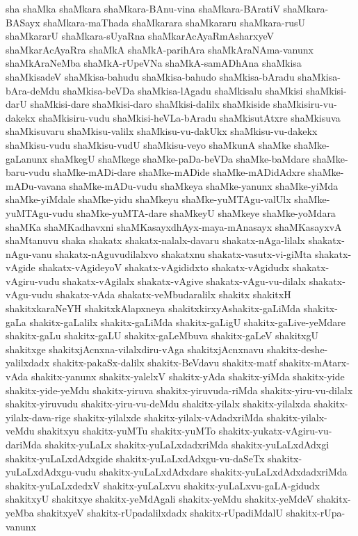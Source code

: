 {sha
shaMka
shaMkara
shaMkara-BAnu-vina
shaMkara-BAratiV
shaMkara-BASayx
shaMkara-maThada
shaMkarara
shaMkararu
shaMkara-rusU
shaMkararU
shaMkara-sUyaRna
shaMkarAcAyaRmAsharxyeV
shaMkarAcAyaRra
shaMkA
shaMkA-parihAra
shaMkAraNAma-vanunx
shaMkAraNeMba
shaMkA-rUpeVNa
shaMkA-samADhAna
shaMkisa
shaMkisadeV
shaMkisa-bahudu
shaMkisa-bahudo
shaMkisa-bAradu
shaMkisa-bAra-deMdu
shaMkisa-beVDa
shaMkisa-lAgadu
shaMkisalu
shaMkisi
shaMkisi-darU
shaMkisi-dare
shaMkisi-daro
shaMkisi-dalilx
shaMkiside
shaMkisiru-vu-dakekx
shaMkisiru-vudu
shaMkisi-heVLa-bAradu
shaMkisutAtxre
shaMkisuva
shaMkisuvaru
shaMkisu-valilx
shaMkisu-vu-dakUkx
shaMkisu-vu-dakekx
shaMkisu-vudu
shaMkisu-vudU
shaMkisu-veyo
shaMkunA
shaMke
shaMke-gaLanunx
shaMkegU
shaMkege
shaMke-paDa-beVDa
shaMke-baMdare
shaMke-baru-vudu
shaMke-mADi-dare
shaMke-mADide
shaMke-mADidAdxre
shaMke-mADu-vavana
shaMke-mADu-vudu
shaMkeya
shaMke-yanunx
shaMke-yiMda
shaMke-yiMdale
shaMke-yidu
shaMkeyu
shaMke-yuMTAgu-valUlx
shaMke-yuMTAgu-vudu
shaMke-yuMTA-dare
shaMkeyU
shaMkeye
shaMke-yoMdara
shaMKa
shaMKadhavxni
shaMKasayxdhAyx-maya-mAnasayx
shaMKasayxvA
shaMtanuvu
shaka
shakatx
shakatx-nalalx-davaru
shakatx-nAga-lilalx
shakatx-nAgu-vanu
shakatx-nAguvudilalxvo
shakatxnu
shakatx-vasutx-vi-giMta
shakatx-vAgide
shakatx-vAgideyoV
shakatx-vAgididxto
shakatx-vAgidudx
shakatx-vAgiru-vudu
shakatx-vAgilalx
shakatx-vAgive
shakatx-vAgu-vu-dilalx
shakatx-vAgu-vudu
shakatx-vAda
shakatx-veMbudaralilx
shakitx
shakitxH
shakitxkaraNeYH
shakitxkAlapxneya
shakitxkirxyAshakitx-gaLiMda
shakitx-gaLa
shakitx-gaLalilx
shakitx-gaLiMda
shakitx-gaLigU
shakitx-gaLive-yeMdare
shakitx-gaLu
shakitx-gaLU
shakitx-gaLeMbuva
shakitx-gaLeV
shakitxgU
shakitxge
shakitxjAcnxna-vilalxdiru-vAga
shakitxjAcnxnavu
shakitx-deshe-yalilxdadx
shakitx-pakaSx-dalilx
shakitx-BeVdavu
shakitx-matf
shakitx-mAtarx-vAda
shakitx-yanunx
shakitx-yalelxV
shakitx-yAda
shakitx-yiMda
shakitx-yide
shakitx-yide-yeMdu
shakitx-yiruva
shakitx-yiruvuda-riMda
shakitx-yiru-vu-dilalx
shakitx-yiruvudu
shakitx-yiru-vu-deMdu
shakitx-yilalx
shakitx-yilalxda
shakitx-yilalx-dava-rige
shakitx-yilalxde
shakitx-yilalx-vAdadxriMda
shakitx-yilalx-veMdu
shakitxyu
shakitx-yuMTu
shakitx-yuMTo
shakitx-yukatx-vAgiru-vu-dariMda
shakitx-yuLaLx
shakitx-yuLaLxdadxriMda
shakitx-yuLaLxdAdxgi
shakitx-yuLaLxdAdxgide
shakitx-yuLaLxdAdxgu-vu-daSeTx
shakitx-yuLaLxdAdxgu-vudu
shakitx-yuLaLxdAdxdare
shakitx-yuLaLxdAdxdadxriMda
shakitx-yuLaLxdedxV
shakitx-yuLaLxvu
shakitx-yuLaLxvu-gaLA-gidudx
shakitxyU
shakitxye
shakitx-yeMdAgali
shakitx-yeMdu
shakitx-yeMdeV
shakitx-yeMba
shakitxyeV
shakitx-rUpadalilxdadx
shakitx-rUpadiMdalU
shakitx-rUpa-vanunx
}

